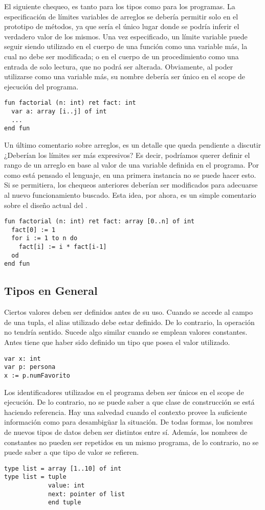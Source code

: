 \documentclass{article}
\begin{document}
El siguiente chequeo, es tanto para los tipos como para los programas.
La especificación de límites variables de arreglos se debería permitir solo en el prototipo de métodos, ya que sería el único lugar donde se podría inferir el verdadero valor de los mismos.
Una vez especificado, un límite variable puede seguir siendo utilizado en el cuerpo de una función como una variable más, la cual no debe ser modificada; o en el cuerpo de un procedimiento como una entrada de solo lectura, que no podrá ser alterada.
Obviamente, al poder utilizarse como una variable más, su nombre debería ser único en el scope de ejecución del programa.
\begin{lstlisting}
fun factorial (n: int) ret fact: int
  var a: array [i..j] of int
  ...
end fun
\end{lstlisting}

Un último comentario sobre arreglos, es un detalle que queda pendiente a discutir ¿Deberían los límites ser más expresivos?
Es decir, podríamos querer definir el rango de un arreglo en base al valor de una variable definida en el programa.
Por como está pensado el lenguaje, en una primera instancia no se puede hacer esto.
Si se permitiera, los chequeos anteriores deberían ser modificados para adecuarse al nuevo funcionamiento buscado.
Esta idea, por ahora, es un simple comentario sobre el diseño actual del \Lang.
\begin{lstlisting}
fun factorial (n: int) ret fact: array [0..n] of int
  fact[0] := 1
  for i := 1 to n do
    fact[i] := i * fact[i-1]
  od
end fun
\end{lstlisting}

\subsection{Tipos en General}

Ciertos valores deben ser definidos antes de su uso.
Cuando se accede al campo de una tupla, el alias utilizado debe estar definido.
De lo contrario, la operación no tendría sentido.
Sucede algo similar cuando se emplean valores constantes.
Antes tiene que haber sido definido un tipo que posea el valor utilizado.
\begin{lstlisting}
var x: int
var p: persona
x := p.numFavorito
\end{lstlisting}

Los identificadores utilizados en el programa deben ser únicos en el scope de ejecución.
De lo contrario, no se puede saber a que clase de construcción se está haciendo referencia.
Hay una salvedad cuando el contexto provee la suficiente información como para desambigüar la situación.
De todas formas, los nombres de nuevos tipos de datos deben ser distintos entre sí.
Además, los nombres de constantes no pueden ser repetidos en un mismo programa, de lo contrario, no se puede saber a que tipo de valor se refieren.
\begin{lstlisting}
type list = array [1..10] of int
type list = tuple
            value: int
            next: pointer of list
            end tuple
\end{lstlisting}
\end{document}

